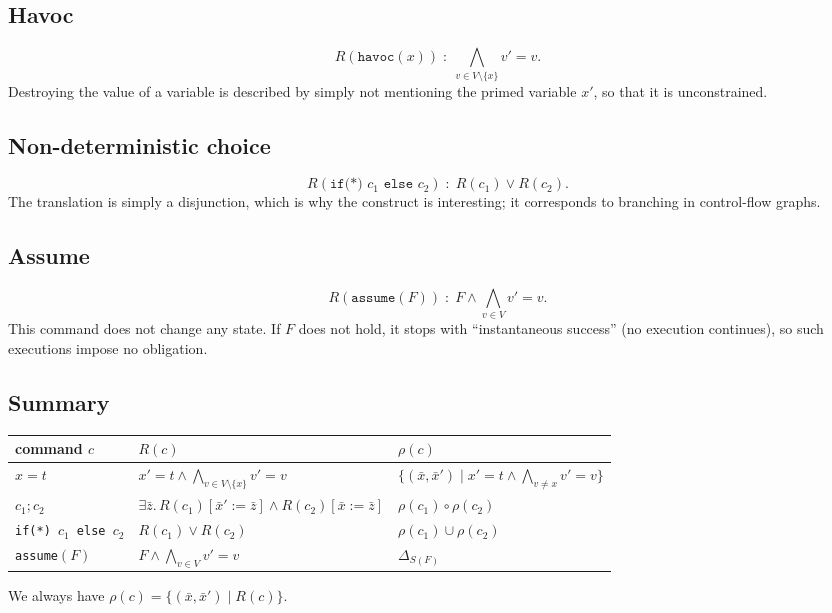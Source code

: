\subsection*{Havoc}
\[
R(\texttt{havoc}(x)) \;:\; \bigwedge_{v \in V \setminus \{x\}} v' = v.
\]
Destroying the value of a variable is described by simply not mentioning the primed variable $x'$, so that it is unconstrained.
 
\subsection*{Non-deterministic choice}
\[
R(\texttt{if(*) } c_1 \texttt{ else } c_2) \;:\; R(c_1) \vee R(c_2).
\]
The translation is simply a disjunction, which is why the construct is interesting; it corresponds to branching in control-flow graphs.
 
\subsection*{Assume}
\[
R(\texttt{assume}(F)) \;:\; F \wedge \bigwedge_{v \in V} v' = v.
\]
This command does not change any state. If $F$ does not hold, it stops with ``instantaneous success'' (no execution continues), so such executions impose no obligation.
 
\subsection*{Summary}
 
 
\begin{center}
\begin{tabular}{lll}
\hline
command $c$ & $R(c)$ & $\rho(c)$ \\
\hline
$x = t$ & $x' = t \wedge \bigwedge_{v \in V\setminus\{x\}} v' = v$ & $\{(\bar x, \bar x') \mid x' = t \wedge \bigwedge_{v \neq x} v' = v\}$ \\
$c_1; c_2$ & $\exists \bar z.\, R(c_1)[\bar x' := \bar z] \wedge R(c_2)[\bar x := \bar z]$ & $\rho(c_1) \circ \rho(c_2)$ \\
\texttt{if(*) $c_1$ else $c_2$} & $R(c_1) \vee R(c_2)$ & $\rho(c_1) \cup \rho(c_2)$ \\
\texttt{assume}$(F)$ & $F \wedge \bigwedge_{v \in V} v' = v$ & $\Delta_{S(F)}$ \\
\hline
\end{tabular}
\end{center}
We always have $\rho(c) = \{(\bar x, \bar x') \mid R(c)\}$.
 
